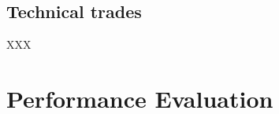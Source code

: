 \documentclass[12pt,letterpaper]{article}
\begin{document}
\subsection{Technical trades}

XXX

\section{Performance Evaluation}
\end{document}
